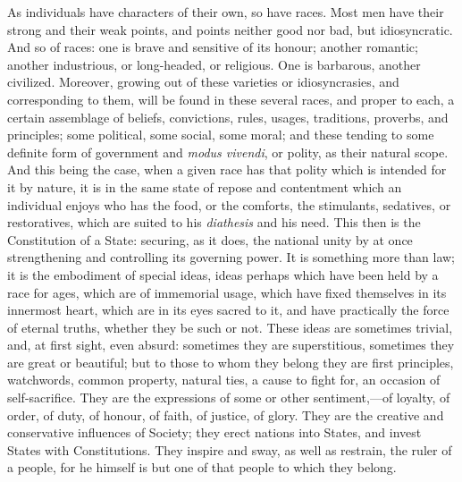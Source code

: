As individuals have characters of their own, so
have races. Most men have their strong and their weak points, and
points neither good nor bad, but idiosyncratic. And so of races: one
is brave and sensitive of its honour; another romantic; another
industrious, or long-headed, or religious. One is barbarous, another
civilized. Moreover, growing out of these varieties or idiosyncrasies,
and corresponding to them, will be found in these several races, and
proper to each, a certain assemblage of beliefs, convictions, rules,
usages, traditions, proverbs, and principles; some political, some
social, some moral; and these tending to some definite form of
government and \emph{modus vivendi}, or polity, as their natural
scope. And this being the case, when a given race has that polity
which is intended for it by nature, it is in the same state of repose
and contentment which an individual enjoys who has the food, or the
comforts, the stimulants, sedatives, or restoratives, which are suited
to his \emph{diathesis} and his need. This then is the Constitution of
a State: securing, as it does, the national unity by at once
strengthening and controlling its governing power. It is something
more than law; it is the embodiment of special ideas, ideas perhaps
which have been held by a race for ages, which are of immemorial
usage, which have fixed themselves in its innermost heart, which are
in its eyes sacred to it, and have practically the force of eternal
truths, whether they be such or not. These ideas are sometimes
trivial, and, at first sight, even absurd: sometimes they are
superstitious, sometimes they are great or beautiful; but to those to
whom they belong they are first principles, watchwords, common
property, natural ties, a cause to fight for, an occasion of
self-sacrifice. They are the expressions of some or other
sentiment,—of loyalty, of order, of duty, of honour, of faith, of
justice, of glory. They are the creative and conservative influences
of Society; they erect nations into States, and invest States with
Constitutions. They inspire and sway, as well as restrain, the ruler
of a people, for he himself is but one of that people to which they
belong.


